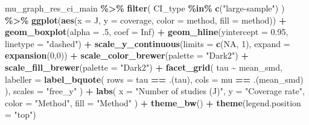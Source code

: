 \documentclass[
]{article}
\newenvironment{Shaded}{\begin{snugshade}}{\end{snugshade}}
\newcommand{\AttributeTok}[1]{\textcolor[rgb]{0.13,0.29,0.53}{#1}}
\newcommand{\ConstantTok}[1]{\textcolor[rgb]{0.56,0.35,0.01}{#1}}
\newcommand{\DecValTok}[1]{\textcolor[rgb]{0.00,0.00,0.81}{#1}}
\newcommand{\FloatTok}[1]{\textcolor[rgb]{0.00,0.00,0.81}{#1}}
\newcommand{\FunctionTok}[1]{\textcolor[rgb]{0.13,0.29,0.53}{\textbf{#1}}}
\newcommand{\NormalTok}[1]{#1}
\newcommand{\SpecialCharTok}[1]{\textcolor[rgb]{0.81,0.36,0.00}{\textbf{#1}}}
\newcommand{\StringTok}[1]{\textcolor[rgb]{0.31,0.60,0.02}{#1}}
\begin{document}
\begin{Shaded}
\begin{Highlighting}[]
\NormalTok{mu\_graph\_res\_ci\_main }\SpecialCharTok{\%\textgreater{}\%}
  \FunctionTok{filter}\NormalTok{(}
\NormalTok{    CI\_type }\SpecialCharTok{\%in\%} \FunctionTok{c}\NormalTok{(}\StringTok{"large{-}sample"}\NormalTok{)}
\NormalTok{  ) }\SpecialCharTok{\%\textgreater{}\%}
  \FunctionTok{ggplot}\NormalTok{(}\FunctionTok{aes}\NormalTok{(}\AttributeTok{x =}\NormalTok{ J, }\AttributeTok{y =}\NormalTok{ coverage, }\AttributeTok{color =}\NormalTok{ method, }\AttributeTok{fill =}\NormalTok{ method)) }\SpecialCharTok{+}
  \FunctionTok{geom\_boxplot}\NormalTok{(}\AttributeTok{alpha =}\NormalTok{ .}\DecValTok{5}\NormalTok{, }\AttributeTok{coef =} \ConstantTok{Inf}\NormalTok{) }\SpecialCharTok{+}
  \FunctionTok{geom\_hline}\NormalTok{(}\AttributeTok{yintercept =} \FloatTok{0.95}\NormalTok{, }\AttributeTok{linetype =} \StringTok{"dashed"}\NormalTok{) }\SpecialCharTok{+}
  \FunctionTok{scale\_y\_continuous}\NormalTok{(}\AttributeTok{limits =} \FunctionTok{c}\NormalTok{(}\ConstantTok{NA}\NormalTok{, }\DecValTok{1}\NormalTok{), }\AttributeTok{expand =} \FunctionTok{expansion}\NormalTok{(}\DecValTok{0}\NormalTok{,}\DecValTok{0}\NormalTok{)) }\SpecialCharTok{+} 
  \FunctionTok{scale\_color\_brewer}\NormalTok{(}\AttributeTok{palette =} \StringTok{"Dark2"}\NormalTok{) }\SpecialCharTok{+}
  \FunctionTok{scale\_fill\_brewer}\NormalTok{(}\AttributeTok{palette =} \StringTok{"Dark2"}\NormalTok{) }\SpecialCharTok{+}
  \FunctionTok{facet\_grid}\NormalTok{(}
\NormalTok{    tau }\SpecialCharTok{\textasciitilde{}}\NormalTok{ mean\_smd, }
    \AttributeTok{labeller =} \FunctionTok{label\_bquote}\NormalTok{(}
      \AttributeTok{rows =}\NormalTok{ tau }\SpecialCharTok{==}\NormalTok{ .(tau),}
      \AttributeTok{cols =}\NormalTok{ mu }\SpecialCharTok{==}\NormalTok{ .(mean\_smd)}
\NormalTok{    ),}
    \AttributeTok{scales =} \StringTok{"free\_y"}
\NormalTok{  ) }\SpecialCharTok{+}
  \FunctionTok{labs}\NormalTok{(}
    \AttributeTok{x =} \StringTok{"Number of studies (J)"}\NormalTok{, }
    \AttributeTok{y =} \StringTok{"Coverage rate"}\NormalTok{, }
    \AttributeTok{color =} \StringTok{"Method"}\NormalTok{,}
    \AttributeTok{fill =} \StringTok{"Method"}
\NormalTok{  ) }\SpecialCharTok{+} 
  \FunctionTok{theme\_bw}\NormalTok{() }\SpecialCharTok{+}
  \FunctionTok{theme}\NormalTok{(}\AttributeTok{legend.position =} \StringTok{"top"}\NormalTok{)}
\end{Highlighting}
\end{Shaded}
\end{document}
